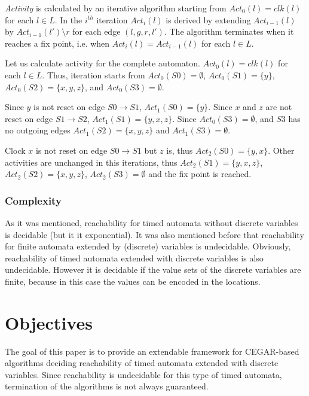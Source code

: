 \emph{Activity} is calculated by an iterative algorithm starting from $Act_0(l)=clk(l)$ for each $l \in L$. In the $i^{th}$ iteration $Act_{i}(l)$ is derived by extending $Act_{i-1}(l)$ by $Act_{i-1}(l')\setminus r$ for each edge $(l,g,r,l')$. The algorithm terminates when it reaches a fix point, i.e. when $Act_{i}(l)=Act_{i-1}(l)$ for each $l\in L$.

\begin{example}
	Let us calculate activity for the complete automaton. $Act_0(l)=clk(l)$ for each $l \in L$. Thus, iteration starts from $Act_0(S0)=\emptyset$, $Act_0(S1)=\{y\}$, $Act_0(S2)=\{x,y,z\}$, and $Act_0(S3)=\emptyset$. 
	
	Since $y$ is not reset on edge $S0 \to S1$, $Act_1(S0)=\{y\}$. Since $x$ and $z$ are not reset on edge $S1 \to S2$, $Act_1(S1)=\{y,x,z\}$. Since $Act_0(S3)=\emptyset$, and $S3$ has no outgoing edges $Act_1(S2)=\{x,y,z\}$ and $Act_1(S3)=\emptyset$.
	
	Clock $x$ is not reset on edge  $S0 \to S1$ but $z$ is, thus $Act_2(S0)=\{y,x\}$. Other activities are unchanged in this iterations, thus $Act_2(S1)=\{y,x,z\}$, $Act_2(S2)=\{x,y,z\}$, $Act_2(S3)=\emptyset$ and the fix point is reached.
	
\end{example}


\subsubsection{Complexity}

As it was mentioned, reachability for timed automata without discrete variables is decidable (but it it exponential). It was also mentioned before that reachability for finite automata extended by (discrete) variables is undecidable. Obviously, reachability of timed automata extended with discrete variables is also undecidable. However it is decidable if the value sets of the discrete variables are finite, because in this case the values can be encoded in the locations. 



\section{Objectives}

The goal of this paper is to provide an extendable framework for CEGAR-based algorithms deciding reachability of timed automata extended with discrete variables. Since reachability is undecidable for this type of timed automata, termination of the algorithms is not always guaranteed.

